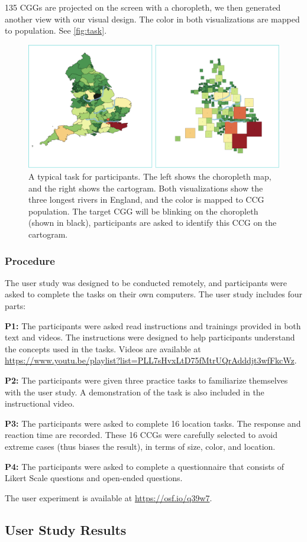 135 CGGs are projected on the screen with a choropleth, we then generated another view with our visual design. The color in both visualizations are mapped to population. See \autoref{fig:task}.

{
    \begin{figure}[htb!]
        \centering
        \includegraphics[width=\columnwidth,keepaspectratio]{figure/evaluation/task.png}
        \caption{A typical task for participants. The left shows the choropleth map, and the right shows the cartogram. Both visualizations show the three longest rivers in England, and the color is mapped to CCG population. The target CGG will be blinking on the choropleth (shown in black), participants are asked to identify this CCG on the cartogram.}
        \label{fig:task}
    \end{figure}
}

\subsubsection{Procedure}

The user study was designed to be conducted remotely, and participants were asked to complete the tasks on their own computers. The user study includes four parts:

\textbf{P1:} The participants were asked read instructions and trainings provided in both text and videos. The instructions were designed to help participants understand the concepts used in the tasks. Videos are available at \url{https://www.youtu.be/playlist?list=PLL7sHvxLtD75fMtrUQrAdddjt3wfFkcWz}.

\textbf{P2:} The participants were given three practice tasks to familiarize themselves with the user study. A demonstration of the task is also included in the instructional video.

\textbf{P3:} The participants were asked to complete 16 location tasks. The response and reaction time are recorded. These 16 CCGs were carefully selected to avoid extreme cases (thus biases the result), in terms of size, color, and location.

\textbf{P4:} The participants were asked to complete a questionnaire that consists of Likert Scale questions and open-ended questions.

The user experiment is available at \url{https://osf.io/q39w7}.

\subsection{User Study Results}

\color{black}
